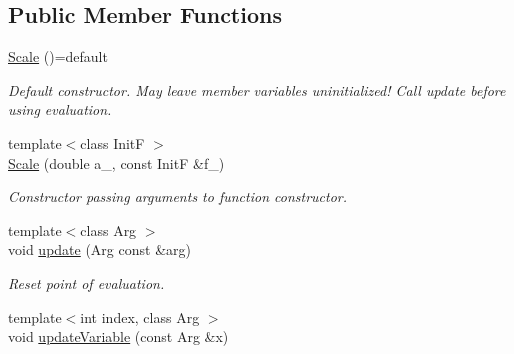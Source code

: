 \subsection*{Public Member Functions}
\begin{DoxyCompactItemize}
\item 
\hypertarget{structFunG_1_1MathematicalOperations_1_1Scale_a8a1c804cb79b41f4e6df28d1e6fe1b72}{\hyperlink{structFunG_1_1MathematicalOperations_1_1Scale_a8a1c804cb79b41f4e6df28d1e6fe1b72}{Scale} ()=default}\label{structFunG_1_1MathematicalOperations_1_1Scale_a8a1c804cb79b41f4e6df28d1e6fe1b72}

\begin{DoxyCompactList}\small\item\em Default constructor. May leave member variables uninitialized! Call update before using evaluation. \end{DoxyCompactList}\item 
{\footnotesize template$<$class Init\-F $>$ }\\\hyperlink{structFunG_1_1MathematicalOperations_1_1Scale_ab86612b868aaee66786793da2ec7a54a}{Scale} (double a\-\_\-, const Init\-F \&f\-\_\-)
\begin{DoxyCompactList}\small\item\em Constructor passing arguments to function constructor. \end{DoxyCompactList}\item 
\hypertarget{structFunG_1_1MathematicalOperations_1_1Scale_adf33e493258919142e39bcb9d27dafd2}{{\footnotesize template$<$class Arg $>$ }\\void \hyperlink{structFunG_1_1MathematicalOperations_1_1Scale_adf33e493258919142e39bcb9d27dafd2}{update} (Arg const \&arg)}\label{structFunG_1_1MathematicalOperations_1_1Scale_adf33e493258919142e39bcb9d27dafd2}

\begin{DoxyCompactList}\small\item\em Reset point of evaluation. \end{DoxyCompactList}\item 
\hypertarget{structFunG_1_1MathematicalOperations_1_1Scale_a5241be9984371f5cf5890d670ae6ed93}{{\footnotesize template$<$int index, class Arg $>$ }\\void \hyperlink{structFunG_1_1MathematicalOperations_1_1Scale_a5241be9984371f5cf5890d670ae6ed93}{update\-Variable} (const Arg \&x)}\label{structFunG_1_1MathematicalOperations_1_1Scale_a5241be9984371f5cf5890d670ae6ed93}


\end{DoxyCompactItemize}
